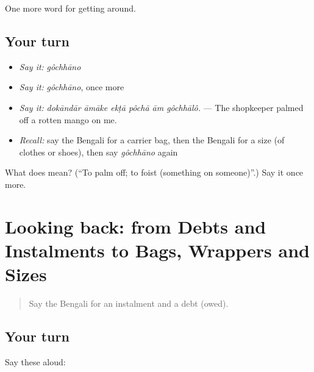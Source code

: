 \begin{grammarlens}[title={What you've built}]
One more word for getting around.
\end{grammarlens}

\subsection*{Your turn}
\begin{itemize}
\raggedright
  \item \emph{Say it:} \emph{gôchhāno}
  \item \emph{Say it:} \emph{gôchhāno}, once more
  \item \emph{Say it:} \emph{dokāndār āmāke ekṭā pôchā ām gôchhālô.} — The shopkeeper palmed off a rotten mango on me.
  \item \emph{Recall:} say the Bengali for a carrier bag, then the Bengali for a size (of clothes or shoes), then say \emph{gôchhāno} again
\end{itemize}

\begin{tcolorbox}[breakable,colback=teal!4,colframe=teal!35!black,title={Before you move on}]
What does  mean? (\textquotedblleft{}To palm off; to foist (something on someone)\textquotedblright{}.) Say it once more.
\end{tcolorbox}
\section[(dialogue)]{Looking back: from Debts and Instalments to Bags, Wrappers and Sizes}

\label{lesson:BN-R423-review-416-423}



\begin{quote}
Say the Bengali for an instalment and a debt (owed).
\end{quote}

\subsection*{Your turn}
Say these aloud:

